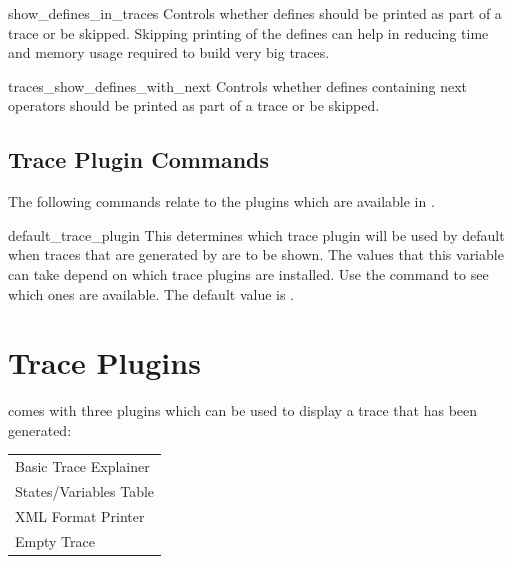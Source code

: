 \begin{nusmvVar} {show\_defines\_in\_traces}{}{}
Controls whether defines should be printed as part of a trace or be
skipped. Skipping printing of the defines can help in reducing time
and memory usage required to build very big traces.
\end{nusmvVar}

\begin{nusmvVar} {traces\_show\_defines\_with\_next}{}{}
Controls whether defines containing next operators should be printed
as part of a trace or be skipped.
\end{nusmvVar}

\subsection{Trace Plugin Commands}
\label{Trace Plugin Commands}
The following commands relate to the plugins which are available
in \nusmv.



\begin{nusmvVar} {default\_trace\_plugin}{}{}
This determines which trace plugin will be used by default when traces
that are generated by \nusmv are to be shown. The values that this
variable can take depend on which trace plugins are installed. Use the
command
 to see which ones are available. The default
value is .
\end{nusmvVar}





\section{Trace Plugins}
\label{Trace Plugins}
\nusmv comes with three plugins which can be used to display a trace
that has been generated:

\begin{center}
\begin{tabular}{l}
Basic Trace Explainer\\
States/Variables Table\\
XML Format Printer\\
Empty Trace\\
\end{tabular}
\end{center}

